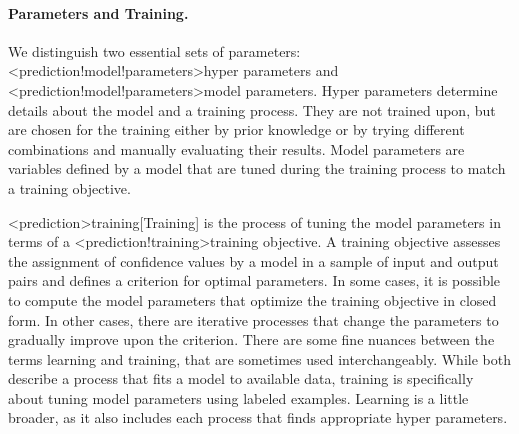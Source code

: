 \documentclass[../document.tex]{subfiles}
\begin{document}
    \paragraph{Parameters and Training.}
    We distinguish two essential sets of parameters: <prediction!model!parameters>{hyper parameters} and <prediction!model!parameters>{model parameters}.
    Hyper parameters determine details about the model and a training process. %
    They are not trained upon, but are chosen for the training either by prior knowledge or by trying different combinations and manually evaluating their results.
    Model parameters are variables defined by a model that are tuned during the training process to match a training objective.

    <prediction>{training}[Training] is the process of tuning the model parameters in terms of a <prediction!training>{training objective}.
    A training objective assesses the assignment of confidence values by a model in a sample of input and output pairs and defines a criterion for optimal parameters.
    In some cases, it is possible to compute the model parameters that optimize the training objective in closed form.
    In other cases, there are iterative processes that change the parameters to gradually improve upon the criterion.
    There are some fine nuances between the terms learning and training, that are sometimes used interchangeably.
    While both describe a process that fits a model to available data, training is specifically about tuning model parameters using labeled examples.
    Learning is a little broader, as it also includes each process that finds appropriate hyper parameters.
\end{document}
